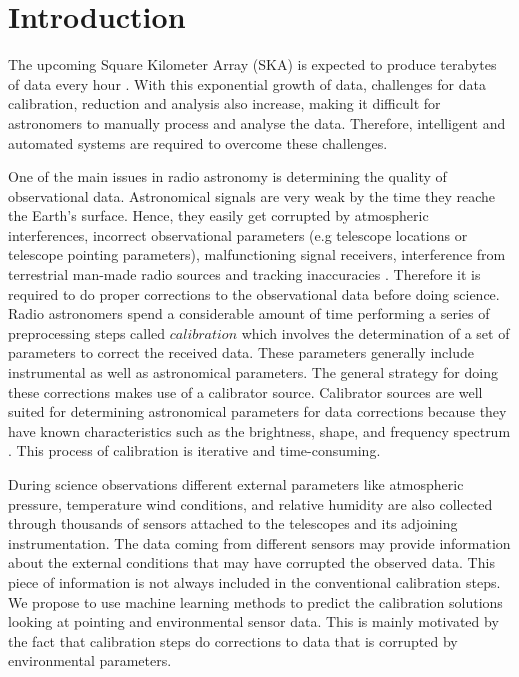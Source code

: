\chapter{Introduction}

The upcoming Square Kilometer Array (SKA) is expected to produce terabytes of data every hour \citep{aniyan2017classifying}. With this exponential growth of data, challenges for data calibration, reduction and analysis also increase, making it difficult for astronomers to manually process and analyse the data. Therefore, intelligent and automated systems are required  to overcome these challenges.

One of the main issues in radio astronomy is determining the quality of observational data. Astronomical signals are very weak  by the time they reache the Earth’s surface. Hence, they easily get corrupted by  atmospheric interferences, incorrect observational parameters (e.g telescope locations or telescope pointing parameters), malfunctioning signal receivers, interference from terrestrial man-made radio sources and tracking inaccuracies \citep{taylor1999synthesis}. Therefore it is required to do proper corrections to the observational data before doing science. Radio astronomers spend a considerable amount of time performing a series of preprocessing steps called $\textit{calibration}$ which involves the determination of a set of parameters to correct the received data. These parameters generally include instrumental as well as astronomical parameters. The general strategy for doing these corrections makes use of a calibrator source. Calibrator sources are well suited for determining astronomical parameters for data corrections because they have known characteristics such as the brightness, shape, and frequency spectrum \citep{taylor1999synthesis}. This process of calibration is iterative and time-consuming.

During science observations different  external parameters like atmospheric pressure, temperature  wind conditions, and relative humidity  are also collected through thousands of sensors attached to the telescopes and its adjoining instrumentation. The data coming from different sensors may provide information about the external conditions that may have corrupted the observed data. This piece of information is not always included in the conventional calibration steps. We propose to use machine learning methods to predict the calibration solutions looking at pointing and environmental sensor data. This is mainly motivated by the fact that calibration steps do corrections to data that is corrupted by environmental parameters.

